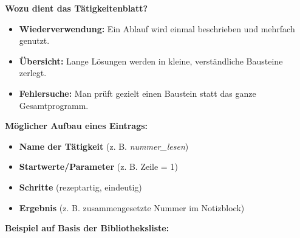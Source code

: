 \documentclass{article}
\begin{document}
        
\textbf{Wozu dient das Tätigkeitenblatt?}

        \begin{itemize}
          \item \textbf{Wiederverwendung:} Ein Ablauf wird einmal beschrieben und mehrfach genutzt.

          \item \textbf{Übersicht:} Lange Lösungen werden in kleine, verständliche Bausteine zerlegt.

          \item \textbf{Fehlersuche:} Man prüft gezielt einen Baustein statt das ganze Gesamtprogramm.

        \end{itemize}

        
\textbf{Möglicher Aufbau eines Eintrags:}

        \begin{itemize}
          \item \textbf{Name der Tätigkeit} (z. B. \emph{nummer\_lesen})

          \item \textbf{Startwerte/Parameter} (z. B. Zeile = 1)

          \item \textbf{Schritte} (rezeptartig, eindeutig)

          \item \textbf{Ergebnis} (z. B. zusammengesetzte Nummer im Notizblock)

        \end{itemize}

        
\textbf{Beispiel auf Basis der Bibliotheksliste:}
\end{document}
